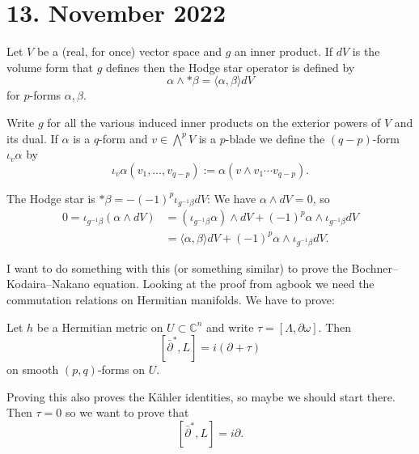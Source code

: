\documentclass[11pt]{article}
\theoremstyle{definition}
\newcommand{\kk}[1]{\mathbb{#1}}
\begin{document}
\section{13. November 2022}

Let $V$ be a (real, for once) vector space and $g$ an inner product.
If $dV$ is the volume form that $g$ defines then the Hodge star operator is
defined by
$$
\alpha \wedge * \beta = \langle \alpha, \beta \rangle dV
$$
for $p$-forms $\alpha,\beta$.

Write $g$ for all the various induced inner products on the exterior powers of
$V$ and its dual.
If $\alpha$ is a $q$-form and $v \in \bigwedge^p V$ is a $p$-blade we define
the $(q-p)$-form $\iota_v\alpha$ by
$$
\iota_v \alpha (v_1, \ldots, v_{q-p})
:= \alpha(v \wedge v_1 \cdots v_{q-p}).
$$

The Hodge star is $* \beta = -(-1)^p \iota_{g^{-1}\beta} dV$:
We have $\alpha \wedge dV = 0$, so
\begin{align*}
0 = \iota_{g^{-1}\beta} (\alpha \wedge dV)
&= (\iota_{g^{-1}\beta} \alpha) \wedge dV
+ (-1)^p \alpha \wedge \iota_{g^{-1}\beta} dV
\\
&= \langle \alpha, \beta \rangle dV
+ (-1)^p \alpha \wedge \iota_{g^{-1}\beta} dV.
\end{align*}

I want to do something with this (or something similar) to prove the
Bochner--Kodaira--Nakano equation.
Looking at the proof from agbook we need the commutation relations on Hermitian
manifolds.
We have to prove:

Let $h$ be a Hermitian metric on $U \subset \kk C^n$ and write
$\tau = [\Lambda, \partial \omega]$.
Then
$$
[\bar\partial^*, L] = i(\partial + \tau)
$$
on smooth $(p,q)$-forms on $U$.

Proving this also proves the K\"ahler identities, so maybe we should start there.
Then $\tau = 0$ so we want to prove that
$$
[\bar\partial^*, L] = i\partial.
$$
\end{document}
